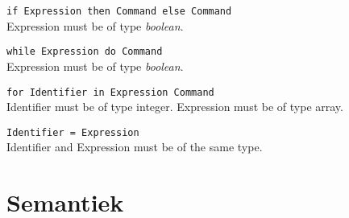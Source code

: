 \texttt{if Expression then Command else Command} \\ Expression must be of type \emph{boolean}. 

\texttt{while Expression do Command} \\ Expression must be of type \emph{boolean}.

\texttt{for Identifier in Expression Command} \\ Identifier must be of type integer. Expression must be of type array. 

\texttt{Identifier = Expression} \\ Identifier and Expression must be of the same type.


\section{Semantiek} %
\label{sec:semantiek}


\clearpage